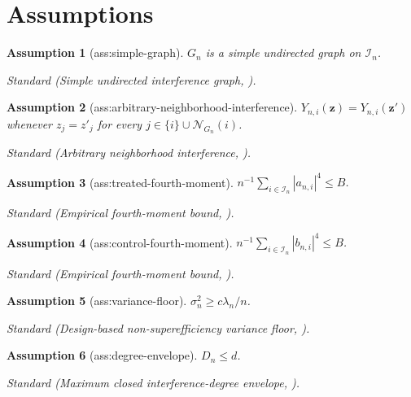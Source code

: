 \documentclass{article}
\newtheorem{assumption}{Assumption}
\begin{document}
\section{Assumptions}

\begin{assumption}[ass:simple-graph]\label{ass:simple-graph}
\(G_n\) is a simple undirected graph on \(\mathcal I_n\).
\par\smallskip\noindent\emph{Standard} (Simple undirected interference graph, \cite{KandirosPipisDaskalakisHarshaw2024CGD}).
\end{assumption}

\begin{assumption}[ass:arbitrary-neighborhood-interference]\label{ass:arbitrary-neighborhood-interference}
\(Y_{n,i}(\mathbf z)=Y_{n,i}(\mathbf z')\) whenever \(z_j=z'_j\) for every \(j\in\{i\}\cup\mathcal N_{G_n}(i)\).
\par\smallskip\noindent\emph{Standard} (Arbitrary neighborhood interference, \cite{KandirosPipisDaskalakisHarshaw2024CGD}).
\end{assumption}

\begin{assumption}[ass:treated-fourth-moment]\label{ass:treated-fourth-moment}
\(n^{-1}\sum_{i\in\mathcal I_n}|a_{n,i}|^4\le B\).
\par\smallskip\noindent\emph{Standard} (Empirical fourth-moment bound, \cite{KandirosPipisDaskalakisHarshaw2024CGD}).
\end{assumption}

\begin{assumption}[ass:control-fourth-moment]\label{ass:control-fourth-moment}
\(n^{-1}\sum_{i\in\mathcal I_n}|b_{n,i}|^4\le B\).
\par\smallskip\noindent\emph{Standard} (Empirical fourth-moment bound, \cite{KandirosPipisDaskalakisHarshaw2024CGD}).
\end{assumption}

\begin{assumption}[ass:variance-floor]\label{ass:variance-floor}
\(\sigma_n^2\ge c\lambda_n/n\).
\par\smallskip\noindent\emph{Standard} (Design-based non-superefficiency variance floor, \cite{KandirosPipisDaskalakisHarshaw2024CGD}).
\end{assumption}

\begin{assumption}[ass:degree-envelope]\label{ass:degree-envelope}
\(D_n\le d\).
\par\smallskip\noindent\emph{Standard} (Maximum closed interference-degree envelope, \cite{KandirosPipisDaskalakisHarshaw2024CGD}).
\end{assumption}
\end{document}
